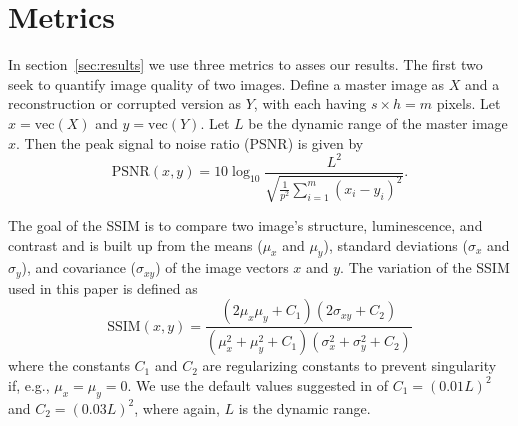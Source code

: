 \documentclass[twocolumn,oneside]{IEEEtran/IEEEtran}
\begin{document}




\section{Metrics}\label{sec:rdi}
In section~\ref{sec:results} we use three metrics to asses our results. The first two seek to quantify image quality of two images. 
Define a master image as $X$ and a reconstruction or corrupted version as $Y$, with each having $s\times h=m$ pixels. Let $x=\textrm{vec}(X)$ and $y=\textrm{vec}(Y)$. Let $L$ be the dynamic range of the master image $x$. Then the peak signal to noise ratio (PSNR) is given by
\begin{equation*}
  \text{PSNR}(x,y) = 10\log_{10}\frac{L^2}
  {\sqrt{\frac{1}{p^2} \sum_{i=1}^{m}( x_{i} - y_{i})^2 }}.
\end{equation*}

The goal of the SSIM is to compare two image's structure, luminescence, and contrast and is built up from the means ($\mu_x$ and $\mu_y$), standard deviations ($\sigma_x$ and $\sigma_y$), and covariance ($\sigma_{xy}$) of the image vectors $x$ and $y$.  
The variation of the SSIM used in this paper is defined as
\begin{equation*}
  \text{SSIM}(x,y) = \frac{(2\mu_x\mu_y + C_1)(2\sigma_{xy}+C_2)}
  {(\mu_x^2 + \mu_y^2 + C_1)(\sigma_x^2 + \sigma_y^2 + C_2)}
\end{equation*}
where the constants $C_1$ and $C_2$ are regularizing constants to prevent singularity if, e.g., $\mu_x=\mu_y=0$. We use the default values suggested in \cite{wang_image_2004} of $C_1=(0.01L)^2$ and ${C_2=(0.03L)^2}$, where again, $L$ is the dynamic range.
\end{document}
